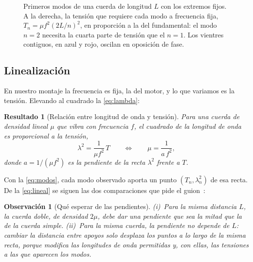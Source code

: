\documentclass[a4paper,11pt]{amsart}
\numberwithin{equation}{section}
\theoremstyle{cienplano}
\newtheorem{resultado}[proposicion]{Resultado}
\theoremstyle{ciendef}
\theoremstyle{cienobs}
\newtheorem{observacion}[proposicion]{Observación}
\newcommand{\modo}[5]{%
  \foreach \j in {1,...,#5}{%
    \pgfmathsetmacro{\xini}{(#1)+(#3)*(\j-1)/(#5)}%
    \pgfmathsetmacro{\xfin}{(#1)+(#3)*\j/(#5)}%
    \pgfmathtruncatemacro{\paridad}{mod(\j,2)}%
    \ifnum\paridad=1 \def\cl{azulprof}\def\cf{azulclaro}\else\def\cl{acento}\def\cf{rojoclaro}\fi
    \fill[\cf!55] plot[domain=\xini:\xfin, samples=40, smooth] (\x,{(#2)+(#4)*sin((#5)*180*(\x-(#1))/(#3))})
      -- plot[domain=\xfin:\xini, samples=40, smooth] (\x,{(#2)-(#4)*sin((#5)*180*(\x-(#1))/(#3))}) -- cycle;
    \draw[\cl, line width=0.9pt] plot[domain=\xini:\xfin, samples=40, smooth] (\x,{(#2)+(#4)*sin((#5)*180*(\x-(#1))/(#3))});
    \draw[\cl!75, line width=0.5pt, densely dashed] plot[domain=\xini:\xfin, samples=40, smooth] (\x,{(#2)-(#4)*sin((#5)*180*(\x-(#1))/(#3))});
  }%
  \foreach \j in {0,...,#5}{\fill[black!80] ({(#1)+(#3)*\j/(#5)},{#2}) circle (1.4pt);}%
}
\begin{document}
\begin{figure}[ht]
\centering
{}
\caption{Primeros modos de una cuerda de longitud $L$ con los extremos fijos.
A la derecha, la tensión que requiere cada modo a frecuencia fija,
$T_n=\mu f^{2}(2L/n)^{2}$, en proporción a la del fundamental: el modo $n=2$
necesita la cuarta parte de tensión que el $n=1$. Los vientres contiguos,
en azul y rojo, oscilan en oposición de fase.}
\label{fig:modos}
\end{figure}

\subsection{Linealización}\label{sec:linealizacion}
En nuestro montaje la frecuencia es fija, la del motor, y lo que variamos es
la tensión. Elevando al cuadrado la \cref{eq:lambda}:

\begin{resultado}[Relación entre longitud de onda y tensión]\label{res:lineal}
Para una cuerda de densidad lineal $\mu$ que vibra con frecuencia $f$, el
cuadrado de la longitud de onda es proporcional a la tensión,
\begin{equation}\label{eq:lineal}
  \lambda^{2}=\frac{1}{\mu f^{2}}\,T
  \qquad\Longleftrightarrow\qquad
  \mu=\frac{1}{a\,f^{2}},
\end{equation}
donde $a=1/(\mu f^{2})$ es la pendiente de la recta $\lambda^{2}$ frente a $T$.
\end{resultado}

Con la \cref{eq:modos}, cada modo observado aporta un punto
$(T_n,\lambda_n^{2})$ de esa recta. De la \cref{eq:lineal} se siguen las dos
comparaciones que pide el guion~\cite{GUION-P2}:

\begin{observacion}[Qué esperar de las pendientes]\label{obs:pendientes}
(i)~Para la misma distancia $L$, la cuerda doble, de densidad $2\mu$, debe
dar una pendiente que sea la \emph{mitad} que la de la cuerda simple.
(ii)~Para la misma cuerda, la pendiente \emph{no depende} de $L$: cambiar la
distancia entre apoyos solo desplaza los puntos a lo largo de la misma recta,
porque modifica las longitudes de onda permitidas y, con ellas, las tensiones a
las que aparecen los modos.
\end{observacion}
\end{document}
